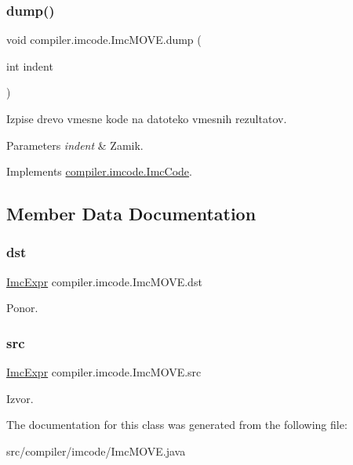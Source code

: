 \subsubsection{\texorpdfstring{dump()}{dump()}}
{\footnotesize\ttfamily void compiler.\+imcode.\+Imc\+M\+O\+V\+E.\+dump (\begin{DoxyParamCaption}\item[{int}]{indent }\end{DoxyParamCaption})}

Izpise drevo vmesne kode na datoteko vmesnih rezultatov.


\begin{DoxyParams}{Parameters}
{\em indent} & Zamik. \\
\hline
\end{DoxyParams}


Implements \hyperlink{interfacecompiler_1_1imcode_1_1_imc_code_a26451dea2ab4dbd7054ac33f4c6d71fe}{compiler.\+imcode.\+Imc\+Code}.



\subsection{Member Data Documentation}
\mbox{\label{classcompiler_1_1imcode_1_1_imc_m_o_v_e_afff762f9e899ac9d444f01b18d5df5e8}} 
\subsubsection{\texorpdfstring{dst}{dst}}
{\footnotesize\ttfamily \hyperlink{classcompiler_1_1imcode_1_1_imc_expr}{Imc\+Expr} compiler.\+imcode.\+Imc\+M\+O\+V\+E.\+dst}

Ponor. \mbox{\label{classcompiler_1_1imcode_1_1_imc_m_o_v_e_a58754ad36446fb303d6fa1207c6110b3}} 
\subsubsection{\texorpdfstring{src}{src}}
{\footnotesize\ttfamily \hyperlink{classcompiler_1_1imcode_1_1_imc_expr}{Imc\+Expr} compiler.\+imcode.\+Imc\+M\+O\+V\+E.\+src}

Izvor. 

The documentation for this class was generated from the following file\+:\begin{DoxyCompactItemize}
\item 
src/compiler/imcode/Imc\+M\+O\+V\+E.\+java\end{DoxyCompactItemize}
